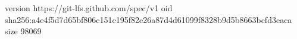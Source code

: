 version https://git-lfs.github.com/spec/v1
oid sha256:a4e4f5d7d65bf806c151c195f82e26a87d4d61099f8328b9d5b8663bcfd3eaca
size 98069
